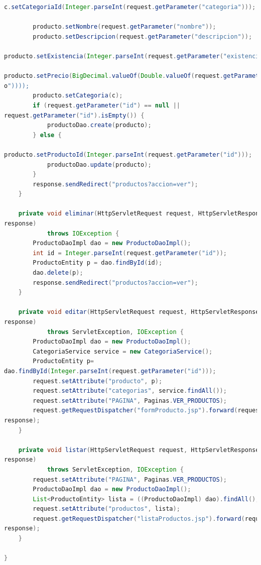 \documentclass[a4paper,12pt]{article}
\begin{document}
\begin{lstlisting}[language=Java, style=customJava, 
caption={ProductosServlet.java}, 
captionpos=b,basicstyle=\fontfamily{cmss}\small]
        c.setCategoriaId(Integer.parseInt(request.getParameter("categoria")));

        producto.setNombre(request.getParameter("nombre"));
        producto.setDescripcion(request.getParameter("descripcion"));
        
producto.setExistencia(Integer.parseInt(request.getParameter("existencia")));
        
producto.setPrecio(BigDecimal.valueOf(Double.valueOf(request.getParameter("preci
o"))));
        producto.setCategoria(c);
        if (request.getParameter("id") == null || 
request.getParameter("id").isEmpty()) {
            productoDao.create(producto);
        } else {
            
producto.setProductoId(Integer.parseInt(request.getParameter("id")));
            productoDao.update(producto);
        }
        response.sendRedirect("productos?accion=ver");
    }

    private void eliminar(HttpServletRequest request, HttpServletResponse 
response)
            throws IOException {
        ProductoDaoImpl dao = new ProductoDaoImpl();
        int id = Integer.parseInt(request.getParameter("id"));
        ProductoEntity p = dao.findById(id);
        dao.delete(p);
        response.sendRedirect("productos?accion=ver");
    }

    private void editar(HttpServletRequest request, HttpServletResponse 
response)
            throws ServletException, IOException {
        ProductoDaoImpl dao = new ProductoDaoImpl();
        CategoriaService service = new CategoriaService();
        ProductoEntity p= 
dao.findById(Integer.parseInt(request.getParameter("id")));
        request.setAttribute("producto", p);
        request.setAttribute("categorias", service.findAll());
        request.setAttribute("PAGINA", Paginas.VER_PRODUCTOS);
        request.getRequestDispatcher("formProducto.jsp").forward(request, 
response);
    }

    private void listar(HttpServletRequest request, HttpServletResponse 
response)
            throws ServletException, IOException {
        request.setAttribute("PAGINA", Paginas.VER_PRODUCTOS);
        ProductoDaoImpl dao = new ProductoDaoImpl();
        List<ProductoEntity> lista = ((ProductoDaoImpl) dao).findAll();
        request.setAttribute("productos", lista);
        request.getRequestDispatcher("listaProductos.jsp").forward(request, 
response);
    }

}
\end{lstlisting}
\end{document}
